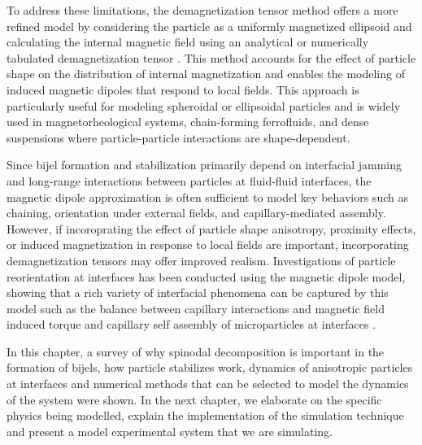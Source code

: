 To address these limitations, the demagnetization tensor method offers a more refined model by considering the particle as a uniformly magnetized ellipsoid and calculating the internal magnetic 
field using an analytical or numerically tabulated demagnetization tensor \cite{takahashi_ellipsoids_2017}. 
This method accounts for the effect of particle shape on the distribution of internal magnetization and enables the modeling of induced magnetic 
dipoles that respond to local fields. This approach is particularly useful for modeling spheroidal or ellipsoidal particles and is widely 
used in magnetorheological systems, chain-forming ferrofluids, and dense suspensions where particle-particle interactions are shape-dependent.




Since bijel formation and stabilization primarily depend on interfacial jamming and long-range interactions between particles at fluid-fluid interfaces, the magnetic dipole approximation 
is often sufficient to model key behaviors such as chaining, orientation under external fields, and capillary-mediated assembly. However, if incoroprating the effect of particle shape anisotropy, 
proximity effects, or induced magnetization in response to local fields are important, incorporating demagnetization tensors may offer improved realism. Investigations of particle reorientation at
interfaces has been conducted using the magnetic dipole model, showing that a rich variety of interfacial phenomena can be captured by this model such as the balance between capillary interactions
and magnetic field induced torque and capillary self assembly of microparticles at interfaces \cite{xie_direct_2017,davies_interface_2014,davies_assembling_2014}.

In this chapter, a survey of why spinodal decomposition is important in the formation of bijels, how particle stabilizes work, dynamics of anisotropic particles at interfaces 
and numerical methods that can be selected to model the dynamics of the system were shown. In the next chapter, we elaborate on the specific physics being modelled, explain the implementation 
of the simulation technique and present a model experimental system that we are simulating.